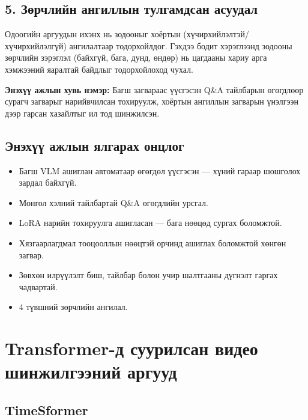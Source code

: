 \subsection*{5. Зөрчлийн ангиллын тулгамдсан асуудал}

\begin{sloppypar}Одоогийн аргуудын ихэнх нь зодооныг хоёртын (хүчирхийлэлтэй/хүчирхийлэлгүй) ангилалтаар тодорхойлдог. Гэхдээ бодит хэрэглээнд зодооны зөрчлийн зэрэглэл (байхгүй, бага, дунд, өндөр) нь цагдааны хариу арга хэмжээний яаралтай байдлыг тодорхойлоход чухал.\end{sloppypar}

\textbf{Энэхүү ажлын хувь нэмэр:} Багш загвараас үүсгэсэн Q\&A тайлбарын өгөгдлөөр сурагч загварыг нарийвчилсан тохируулж, хоёртын ангиллын загварын үнэлгээн дээр гарсан хазайлтыг ил тод шинжилсэн.

\subsection*{Энэхүү ажлын ялгарах онцлог}

\begin{itemize}
\item Багш VLM ашиглан автоматаар өгөгдөл үүсгэсэн — хүний гараар шошголох зардал байхгүй.
\item Монгол хэлний тайлбартай Q\&A өгөгдлийн урсгал.
\item LoRA нарийн тохируулга ашигласан — бага нөөцөд сургах боломжтой.
\item Хязгаарлагдмал тооцооллын нөөцтэй орчинд ашиглах боломжтой хөнгөн загвар.
\item Зөвхөн илрүүлэлт биш, тайлбар болон учир шалтгааны дүгнэлт гаргах чадвартай.
\item 4 түвшний зөрчлийн ангилал.
\end{itemize}

\section{Transformer-д суурилсан видео шинжилгээний аргууд}

\subsection*{TimeSformer}

